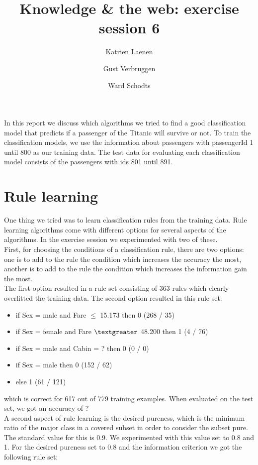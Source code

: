 \documentclass[11pt,a4paper]{article}
\author{
  Katrien Laenen\\
  \and
  Gust Verbruggen\\
  \and
  Ward Schodts
}
\title{Knowledge \& the web: exercise session 6}
\begin{document}
\maketitle
In this report we discuss which algorithms we tried to find a good classification model that predicts if a passenger of the Titanic will survive or not.
To train the classification models, we use the information about passengers with passengerId 1 until 800 as our training data. The test data for evaluating each classification model consists of the passengers with ids 801 until 891. 

\section{Rule learning}
One thing we tried was to learn classification rules from the training data.
Rule learning algorithms come with different options for several aspects of the algorithms. In the exercise session we experimented with two of these.\\
First, for choosing the conditions of a classification rule, there are two options: one is to add to the rule the condition which increases the accuracy the most, another is to add to the rule the condition which increases the information gain the most.\\
The first option resulted in a rule set consisting of 363 rules which clearly overfitted the training data.
The second option resulted in this rule set:
\begin{itemize}

\item if Sex = male and Fare $\leq$ 15.173 then 0  (268 / 35)
\item if Sex = female and Fare $\textgreater$ 48.200 then 1  (4 / 76)
\item if Sex = male and Cabin = ? then 0  (0 / 0)
\item if Sex = male then 0  (152 / 62)
\item else 1  (61 / 121)

\end{itemize}
which is correct for 617 out of 779 training examples.
When evaluated on the test set, we got an accuracy of ?\\
A second aspect of rule learning is the desired pureness, which is the minimum ratio of the major class in a covered subset in order to consider the subset pure. The standard value for this is 0.9. We experimented with this value set to 0.8 and 1.
For the desired pureness set to 0.8 and the information criterion we got the following rule set:
\end{document}
